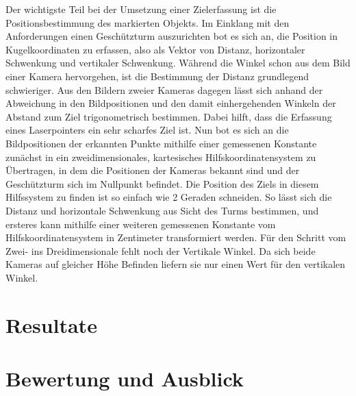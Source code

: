 \documentclass[12pt,a4paper]{article}
\begin{document}
Der wichtigste Teil bei der Umsetzung einer Zielerfassung ist die Positionsbestimmung des markierten Objekts.
Im Einklang mit den Anforderungen einen Geschützturm auszurichten bot es sich an, die Position in Kugelkoordinaten zu erfassen, also als Vektor von Distanz, horizontaler Schwenkung und vertikaler Schwenkung.
Während die Winkel schon aus dem Bild einer Kamera hervorgehen, ist die Bestimmung der Distanz grundlegend schwieriger. Aus den Bildern zweier Kameras dagegen lässt sich anhand der Abweichung in den Bildpositionen und den damit einhergehenden Winkeln der Abstand zum Ziel trigonometrisch bestimmen. Dabei hilft, dass die Erfassung eines Laserpointers ein sehr scharfes Ziel ist.
Nun bot es sich an die Bildpositionen der erkannten Punkte mithilfe einer gemessenen Konstante zunächst in ein zweidimensionales,  kartesisches Hilfskoordinatensystem zu Übertragen, in dem die Positionen der Kameras bekannt sind und der Geschützturm sich im Nullpunkt befindet. Die Position des Ziels in diesem Hilfssystem zu finden ist so einfach wie 2 Geraden schneiden. So lässt sich die Distanz und horizontale Schwenkung aus Sicht des Turms bestimmen, und ersteres kann mithilfe einer weiteren gemessenen Konstante vom Hilfskoordinatensystem in Zentimeter transformiert werden.
Für den Schritt vom Zwei- ins Dreidimensionale fehlt noch der Vertikale Winkel. Da sich beide Kameras auf gleicher Höhe Befinden liefern sie nur einen Wert für den vertikalen Winkel.
\section{Resultate}

\section{Bewertung und Ausblick}
\end{document}
